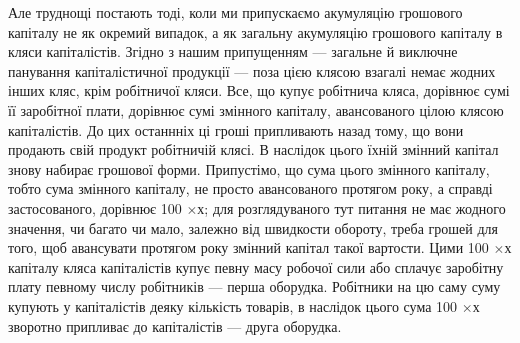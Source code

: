 Але труднощі постають тоді, коли ми припускаємо акумуляцію грошового
капіталу не як окремий випадок, а як загальну акумуляцію грошового
капіталу в кляси капіталістів. Згідно з нашим припущенням —
загальне й виключне панування капіталістичної продукції — поза цією
клясою взагалі немає жодних інших кляс, крім робітничої кляси. Все,
що купує робітнича кляса, дорівнює сумі її заробітної плати, дорівнює
сумі змінного капіталу, авансованого цілою клясою капіталістів. До цих
останнніх ці гроші припливають назад тому, що вони продають свій
продукт робітничій клясі. В наслідок цього їхній змінний капітал знову
набирає грошової форми. Припустімо, що сума цього змінного капіталу,
тобто сума змінного капіталу, не просто авансованого протягом року, а
справді застосованого, дорівнює 100 $× х$; для розглядуваного тут
питання не має жодного значення, чи багато чи мало, залежно від швидкости
обороту, треба грошей для того, щоб авансувати протягом року
змінний капітал такої вартости. Цими 100 $× х$ капіталу кляса капіталістів
купує певну масу робочої сили або сплачує заробітну плату
певному числу робітників — перша оборудка. Робітники на цю саму суму
купують у капіталістів деяку кількість товарів, в наслідок цього сума
100 $× х$ зворотно припливає до капіталістів — друга оборудка.
\parbreak{}  %
